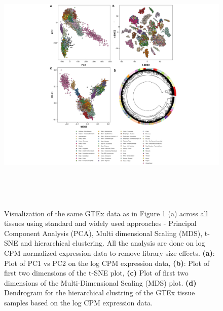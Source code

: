 \documentclass[10pt,letterpaper]{article}
\begin{document}
\begin{figure}[h!]
\includegraphics[height=5in, width=6.5in]{../plots/hierarchical_pca_tsne_combo_plot.pdf}
\caption{Visualization of the same GTEx data as in Figure 1 (a) across all tissues using standard and widely used approaches - Principal Component Analysis (PCA), Multi dimensional Scaling (MDS), t-SNE and hierarchical clustering.
All the analysis are done on log CPM normalized expression data to remove library size effects. \textbf{(a)}: Plot of PC1 vs PC2 on the log CPM expression data, \textbf{(b)}: Plot of first two dimensions of the t-SNE plot, \textbf{(c)} Plot of first two dimensions of the Multi-Dimensional Scaling (MDS) plot. \textbf{(d)} Dendrogram for the hierarchical clustring of the GTEx tissue samples based on the log CPM expression data.}
\label{fig2}
\end{figure}
\end{document}
